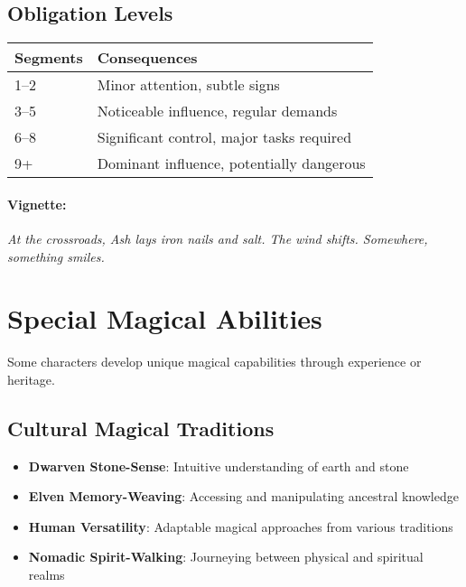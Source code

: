 \begin{multicols}{2}
\subsection*{Obligation Levels}
\begin{center}
\small
\begin{tabular}{ll}
\toprule
\textbf{Segments} & \textbf{Consequences} \\
\midrule
1--2 & Minor attention, subtle signs \\
3--5 & Noticeable influence, regular demands \\
6--8 & Significant control, major tasks required \\
9+   & Dominant influence, potentially dangerous \\
\bottomrule
\end{tabular}
\end{center}

\paragraph{Vignette:}
\emph{At the crossroads, Ash lays iron nails and salt. The wind shifts. Somewhere, something smiles.}

\section{Special Magical Abilities} 

Some characters develop unique magical capabilities through experience or heritage.

\subsection*{Cultural Magical Traditions}
\begin{itemize}
\item \textbf{Dwarven Stone-Sense}: Intuitive understanding of earth and stone
\item \textbf{Elven Memory-Weaving}: Accessing and manipulating ancestral knowledge
\item \textbf{Human Versatility}: Adaptable magical approaches from various traditions
\item \textbf{Nomadic Spirit-Walking}: Journeying between physical and spiritual realms
\end{itemize}


\end{multicols}
